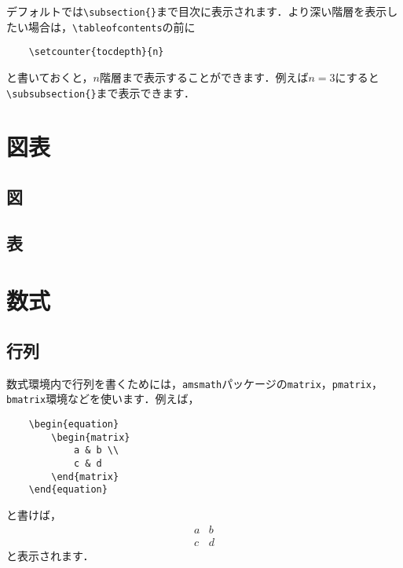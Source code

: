 \documentclass[a4paper, 11pt, uplatex]{jsreport}
\numberwithin{equation}{section}
\theoremstyle{definition}
\begin{document}
デフォルトでは\verb|\subsection{}|まで目次に表示されます．より深い階層を表示したい場合は，\verb|\tableofcontents|の前に
\begin{verbatim}
    \setcounter{tocdepth}{n}
\end{verbatim}
と書いておくと，$n$階層まで表示することができます．例えば$n=3$にすると\verb|\subsubsection{}|まで表示できます．



\chapter{図表}


\section{図}



\section{表}


\chapter{数式}


\section{行列}

数式環境内で行列を書くためには，\verb|amsmath|パッケージの\verb|matrix|，\verb|pmatrix|，\verb|bmatrix|環境などを使います．例えば，
\begin{verbatim}
    \begin{equation}
        \begin{matrix}
            a & b \\
            c & d
        \end{matrix}
    \end{equation}
\end{verbatim}
と書けば，
\begin{equation}
    \begin{matrix}
        a & b \\
        c & d
    \end{matrix}
\end{equation}
と表示されます．
\end{document}

